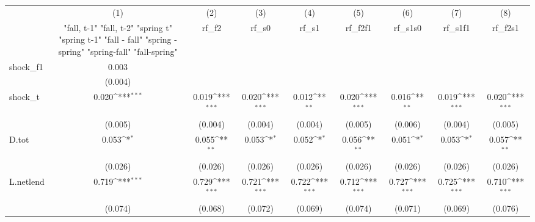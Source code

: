 {
\def\sym#1{\ifmmode^{#1}\else\(^{#1}\)\fi}
\begin{tabular}{l*{8}{c}}
\toprule
            &\multicolumn{1}{c}{(1)}&\multicolumn{1}{c}{(2)}&\multicolumn{1}{c}{(3)}&\multicolumn{1}{c}{(4)}&\multicolumn{1}{c}{(5)}&\multicolumn{1}{c}{(6)}&\multicolumn{1}{c}{(7)}&\multicolumn{1}{c}{(8)}\\
            &\multicolumn{1}{c}{  "fall, t-1" "fall, t-2" "spring t" "spring t-1"  "fall - fall" "spring - spring" "spring-fall" "fall-spring" }&\multicolumn{1}{c}{rf\_f2}&\multicolumn{1}{c}{rf\_s0}&\multicolumn{1}{c}{rf\_s1}&\multicolumn{1}{c}{rf\_f2f1}&\multicolumn{1}{c}{rf\_s1s0}&\multicolumn{1}{c}{rf\_s1f1}&\multicolumn{1}{c}{rf\_f2s1}\\
\midrule
shock\_f1    &       0.003         &                     &                     &                     &                     &                     &                     &                     \\
            &     (0.004)         &                     &                     &                     &                     &                     &                     &                     \\
\addlinespace
shock\_t     &       0.020\sym{***}&       0.019\sym{***}&       0.020\sym{***}&       0.012\sym{**} &       0.020\sym{***}&       0.016\sym{**} &       0.019\sym{***}&       0.020\sym{***}\\
            &     (0.005)         &     (0.004)         &     (0.004)         &     (0.004)         &     (0.005)         &     (0.006)         &     (0.004)         &     (0.005)         \\
\addlinespace
D.tot       &       0.053\sym{*}  &       0.055\sym{**} &       0.053\sym{*}  &       0.052\sym{*}  &       0.056\sym{**} &       0.051\sym{*}  &       0.053\sym{*}  &       0.057\sym{**} \\
            &     (0.026)         &     (0.026)         &     (0.026)         &     (0.026)         &     (0.026)         &     (0.026)         &     (0.026)         &     (0.026)         \\
\addlinespace
L.netlend   &       0.719\sym{***}&       0.729\sym{***}&       0.721\sym{***}&       0.722\sym{***}&       0.712\sym{***}&       0.727\sym{***}&       0.725\sym{***}&       0.710\sym{***}\\
            &     (0.074)         &     (0.068)         &     (0.072)         &     (0.069)         &     (0.074)         &     (0.071)         &     (0.069)         &     (0.076)         \\

\end{tabular}}
